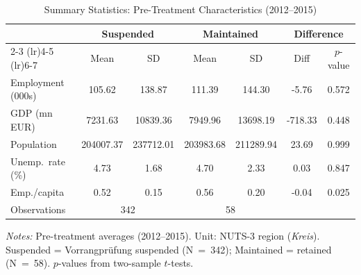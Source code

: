 \begin{table}[H]
\centering
\caption{Summary Statistics: Pre-Treatment Characteristics (2012--2015)}
\label{tab:summary}
\begin{threeparttable}
\footnotesize
\begin{tabular}{lcccccc}
\toprule
 & \multicolumn{2}{c}{Suspended} & \multicolumn{2}{c}{Maintained} & \multicolumn{2}{c}{Difference} \\
\cmidrule(lr){2-3} \cmidrule(lr){4-5} \cmidrule(lr){6-7}
 & Mean & SD & Mean & SD & Diff & $p$-value \\
\midrule
Employment (000s) & 105.62 & 138.87 & 111.39 & 144.30 & -5.76 & 0.572 \\
GDP (mn EUR) & 7231.63 & 10839.36 & 7949.96 & 13698.19 & -718.33 & 0.448 \\
Population & 204007.37 & 237712.01 & 203983.68 & 211289.94 & 23.69 & 0.999 \\
Unemp.\ rate (\%) & 4.73 & 1.68 & 4.70 & 2.33 & 0.03 & 0.847 \\
Emp./capita & 0.52 & 0.15 & 0.56 & 0.20 & -0.04 & 0.025 \\
\midrule
Observations & \multicolumn{2}{c}{342} & \multicolumn{2}{c}{58} & & \\
\bottomrule
\end{tabular}
\begin{tablenotes}[flushleft]
\footnotesize
\item \textit{Notes:} Pre-treatment averages (2012--2015). Unit: NUTS-3 region (\textit{Kreis}). Suspended = Vorrangpr\"ufung suspended (N~=~342); Maintained = retained (N~=~58). $p$-values from two-sample $t$-tests.
\end{tablenotes}
\end{threeparttable}
\end{table}
